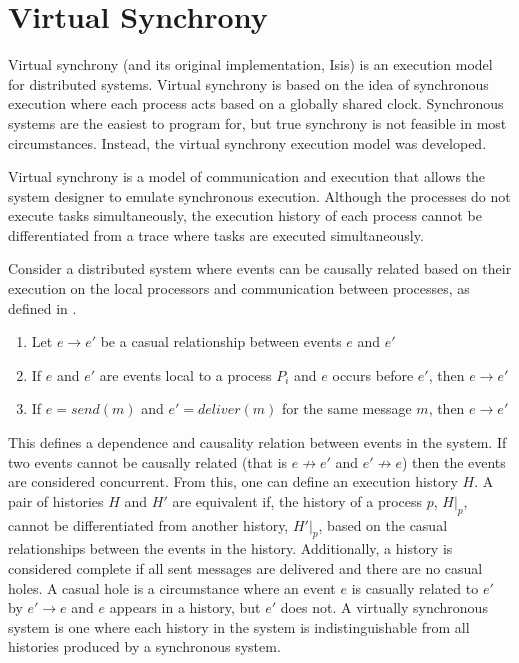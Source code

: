 \section{Virtual Synchrony}
Virtual synchrony (and its original implementation, Isis\cite{ISISTOOLKIT}) is an execution model for distributed systems. Virtual synchrony is based on the idea of synchronous execution where each process acts based on a globally shared clock. Synchronous systems are the easiest to program for, but true synchrony is not feasible in most circumstances. Instead, the virtual synchrony execution model was developed. 

Virtual synchrony is a model of communication and execution that allows the system designer to emulate synchronous execution. Although the processes do not execute tasks simultaneously, the execution history of each process cannot be differentiated from a trace where tasks are executed simultaneously. 

Consider a distributed system where events can be causally related based on their execution on the local processors and communication between processes, as defined in \cite[p~.101]{ISISTOOLKIT}. 

\begin{enumerate}
	\item Let $e \rightarrow e'$ be a casual relationship between events $e$ and $e'$
    \item If $e$ and $e'$ are events local to a process $P_{i}$ and $e$ occurs before $e'$, then $e \rightarrow e'$
    \item If $e = send(m)$ and $e'=deliver(m)$ for the same message $m$, then $e \rightarrow e'$
\end{enumerate}

This defines a dependence and causality relation between events in the system. If two events cannot be causally related (that is $e \not\rightarrow e'$ and $e' \not\rightarrow e$) then the events are considered concurrent. From this, one can define an execution history $H$. A pair of histories $H$ and $H'$ are equivalent if, the history of a process $p$, $H|_{p}$, cannot be differentiated from another history, $H'|_{p}$, based on the casual relationships between the events in the history. \cite[p~.103]{ISISTOOLKIT} Additionally, a history is considered complete if all sent messages are delivered and there are no casual holes. A casual hole is a circumstance where an event $e$ is casually related to $e'$ by $e' \rightarrow e$ and $e$ appears in a history, but $e'$ does not. A virtually synchronous system is one where each history in the system is indistinguishable from all histories produced by a synchronous system. \cite[p~.104]{ISISTOOLKIT}

